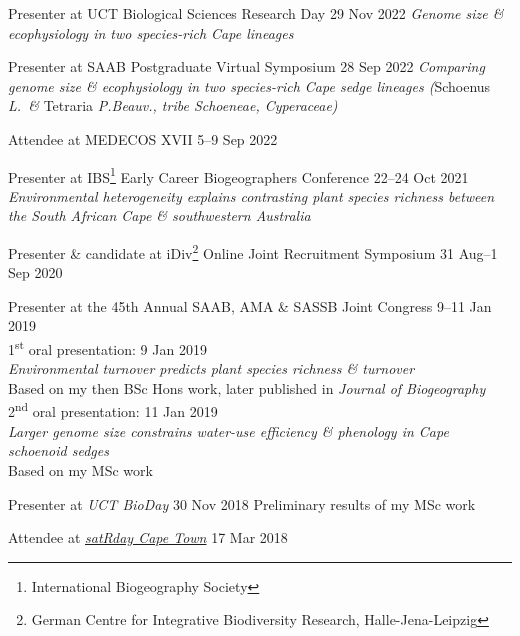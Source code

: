 \documentclass[10pt]{article}
\begin{document}
\begin{hangparas}{2em}{1}

Presenter at UCT Biological Sciences Research Day      \hfill 29 Nov 2022 \break
\textit{Genome size \& ecophysiology in two species-rich Cape lineages}

Presenter at SAAB Postgraduate Virtual Symposium       \hfill 28 Sep 2022 \break
\textit{Comparing genome size \& ecophysiology in two species-rich Cape sedge lineages \break
(}Schoenus\textit{ L.~\& }Tetraria\textit{ P.Beauv., tribe Schoeneae, Cyperaceae)}

Attendee at MEDECOS XVII                                    \hfill 5--9 Sep 2022

Presenter at IBS\footnote{International Biogeography Society}
Early Career Biogeographers Conference                    \hfill 22--24 Oct 2021 \break
\textit{Environmental heterogeneity explains contrasting plant species richness between \break
the South African Cape \& southwestern Australia}

Presenter \& candidate at iDiv\footnote{German Centre for Integrative
Biodiversity Research, Halle-Jena-Leipzig} Online Joint Recruitment Symposium
                                                       \hfill 31 Aug--1 Sep 2020

Presenter at the 45th Annual SAAB, AMA \& SASSB Joint Congress
                                                        \hfill 9--11 Jan 2019 \\
\hspace{2em} 1\textsuperscript{st} oral presentation:       \hfill 9 Jan 2019 \\
\hspace{4em} \textit{Environmental turnover predicts plant species richness \& 
turnover}                                                                     \\
\hspace{4em} Based on my then BSc Hons work, later published in \textit{Journal
of Biogeography}                                                              \\
\hspace{2em} 2\textsuperscript{nd} oral presentation:      \hfill 11 Jan 2019 \\
\hspace{4em} \textit{Larger genome size constrains water-use efficiency \&
phenology in Cape schoenoid sedges}                                           \\
\hspace{4em} Based on my MSc work

Presenter at \textit{UCT BioDay}                       \hfill 30 Nov 2018 \break
Preliminary results of my MSc work

Attendee at \href{https://capetown2018.satrdays.org}{\textit{satRday Cape Town}}
                                                              \hfill 17 Mar 2018

\hfill

\end{hangparas}
\end{document}
